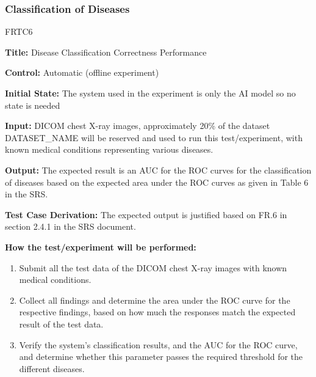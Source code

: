\documentclass[12pt, titlepage]{article}
\begin{document}
\subsubsection{Classification of Diseases}
\label{sec4.1.3}
\begin{itemize}
    \begin{item}
        FRTC6
        \begin{mdframed}[linewidth=0.5mm]
            \textbf{Title:} Disease Classification Correctness Performance \par
            \textbf{Control:} Automatic (offline experiment) \par
            \textbf{Initial State:} The system used in the experiment is only the AI model so no state is needed \par
            \textbf{Input:} DICOM chest X-ray images, approximately 20\% of the dataset DATASET\_NAME will be reserved and used to run this test/experiment, with known medical conditions representing various diseases. \par
            \textbf{Output:} The expected result is an AUC for the ROC curves for the classification of diseases based on the expected area under the ROC curves as given in Table 6 in the SRS. \par
            \textbf{Test Case Derivation:} The expected output is justified based on FR.6 in section 2.4.1 in the SRS document. \par
            \textbf{How the test/experiment will be performed:}
            \begin{enumerate}[noitemsep]
                \item Submit all the test data of the DICOM chest X-ray images with known medical conditions.
                \item Collect all findings and determine the area under the ROC curve for the respective findings, based on how much the responses match the expected result of the test data.
                \item Verify the system's classification results, and the AUC for the ROC curve, and determine whether this parameter passes the required threshold for the different diseases.
            \end{enumerate}
        \end{mdframed}
    \end{item}
\end{itemize}
\end{document}
